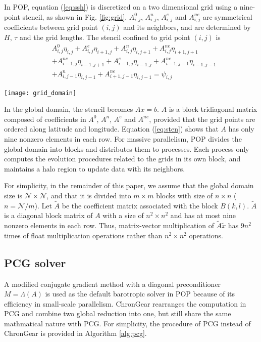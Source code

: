 \documentclass{sig-alternate}
\begin{document}
In POP, equation (\ref{eq:ssh}) is discretized on a two dimensional grid using a nine-point stencil, as shown in Fig. \ref{fig:grid}. $A_{i,j}^0$, $A_{i,j}^n$, $A_{i,j}^e$ and $A_{i,j}^{ne}$ are symmetrical coefficients between grid point $(i,j)$ and its neighbors, and are determined by $H$, $\tau$ and the grid lengths. The stencil confined to grid point $(i,j)$ is
\begin{eqnarray}
\label{eq:sten}
&A_{i,j}^0\eta_{i,j}+A_{i,j}^e\eta_{i+1,j}+A_{i,j}^n\eta_{i,j+1} +A_{i,j}^{ne}\eta_{i+1,j+1}\nonumber\\
&+A_{i-1,j}^{ne}\eta_{i-1,j+1} +A_{i-1,j}^e\eta_{i-1,j}+A_{i-1,j-1}^{ne}\eta_{i-1,j-1}\nonumber\\
&+A_{i,j-1}^n\eta_{i,j-1}+ A_{i+1,j-1}^{ne}\eta_{i,j-1}=\psi_{i,j}
\end{eqnarray}
\begin{figure*}
\begin{center}
\texttt{[image: grid\_domain]}
\caption[]{Grid domain decomposition of POP\label{fig:grid}}
\end{center}
\end{figure*}
In the global domain, the stencil becomes $Ax =b$. 
$A$ is a block tridiagonal matrix composed of coefficients in $A^0$, $A^n$, $A^e$ and $A^{ne}$, provided that the grid points are ordered along latitude and longitude. 
Equation (\ref{eq:sten}) shows that $A$ has only nine nonzero elements in each row. 
For massive parallelism, POP divides the global domain into blocks and distributes them to processes. 
Each process only computes the evolution procedures related to the grids in its own block, and maintains a halo region to update data with its neighbors.

For simplicity, in the remainder of this paper, we assume that the global domain size is $\mathcal{N}\times \mathcal{N}$, and that it is divided into $m\times m$ blocks with size of $n\times n$ ($n=\mathcal{N}/m$). 
Let $\tilde{A}$ be the coefficient matrix associated with the block $B(k,l)$. 
$\tilde{A}$ is a diagonal block matrix of $A$ with a size of $n^2\times n^2$  and has at most nine nonzero elements in each row. 
Thus, matrix-vector multiplication of $\tilde{A}\tilde{x}$ has $9n^2$ times of float multiplication operations rather than $n^2\times n^2$ operations.
\subsection{PCG solver }
A modified conjugate gradient method with a diagonal preconditioner $M = \Lambda(A)$ is used as the default barotropic solver in POP because of its efficiency in small-scale parallelism. ChronGear rearranges the computation in PCG and combine two global reduction into one, but still share the same mathmatical nature with PCG. For simplicity, the procedure of PCG instead of ChronGear is provided in Algorithm \ref{alg:pcg}.
\end{document}
